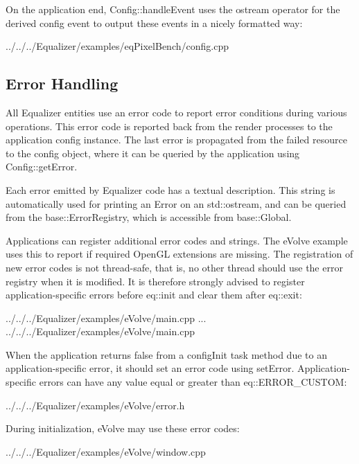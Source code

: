 \documentclass[10pt,a4]{scrartcl}
\begin{document}
On the application end, \textsf{Config::handleEvent} uses the
\textsf{ostream} operator for the derived config event to output these
events in a nicely formatted way:

{\footnotesize
  {../../../Equalizer/examples/eqPixelBench/config.cpp}}


\subsection{\label{sErrorHandling}Error Handling}

All Equalizer entities use an error code to report error conditions during
various operations. This error code is reported back from the render processes
to the application config instance. The last error is propagated from the failed
resource to the config object, where it can be queried by the application using
\textsf{Config::getError}.

Each error emitted by Equalizer code has a textual description. This string is
automatically used for printing an \textsf{Error} on an \textsf{std::ostream},
and can be queried from the \textsf{base::ErrorRegistry}, which is accessible
from \textsf{base::Global}.

Applications can register additional error codes and strings. The
\textsf{eVolve} example uses this to report if required OpenGL extensions are
missing. The registration of new error codes is not thread-safe, that is, no
other thread should use the error registry when it is modified. It is therefore
strongly advised to register application-specific errors before
\textsf{eq::init} and clear them after \textsf{eq::exit}:

{\footnotesize
  {../../../Equalizer/examples/eVolve/main.cpp}}
...
{\footnotesize
  {../../../Equalizer/examples/eVolve/main.cpp}}

When the application returns false from a \textsf{configInit} task method due to
an application-specific error, it should set an error code using
\textsf{setError}. Application-specific errors can have any value equal or
greater than \textsf{eq::ERROR\_CUSTOM}:

{\footnotesize
  {../../../Equalizer/examples/eVolve/error.h}}

During initialization, eVolve may use these error codes:

{\footnotesize
  {../../../Equalizer/examples/eVolve/window.cpp}}
\end{document}
